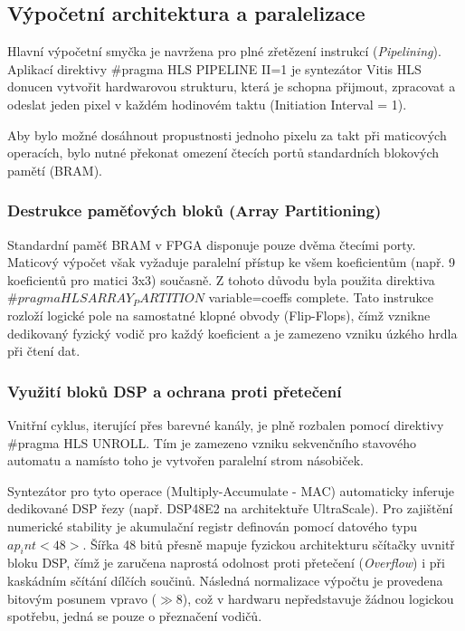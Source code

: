 \documentclass[FM,DP]{tulthesis}
\begin{document}
\subsection{Výpočetní architektura a paralelizace}

Hlavní výpočetní smyčka je navržena pro plné zřetězení instrukcí
(\textit{Pipelining}). Aplikací direktivy \#pragma HLS PIPELINE II=1 je
syntezátor Vitis HLS donucen vytvořit hardwarovou strukturu, která je schopna
přijmout, zpracovat a odeslat jeden pixel v každém hodinovém taktu (Initiation
Interval = 1).

Aby bylo možné dosáhnout propustnosti jednoho pixelu za takt při maticových
operacích, bylo nutné překonat omezení čtecích portů standardních blokových
pamětí (BRAM).

\subsubsection{Destrukce paměťových bloků (Array Partitioning)
}
Standardní paměť BRAM v FPGA disponuje pouze dvěma čtecími porty. Maticový
výpočet však vyžaduje paralelní přístup ke všem koeficientům (např. 9
koeficientů pro matici 3x3) současně. Z tohoto důvodu byla použita direktiva
$\#pragma HLS ARRAY_PARTITION$ variable=coeffs complete. Tato instrukce rozloží
logické pole na samostatné klopné obvody (Flip-Flops), čímž vznikne dedikovaný
fyzický vodič pro každý koeficient a je zamezeno vzniku úzkého hrdla při čtení
dat.

\subsubsection{Využití bloků DSP a ochrana proti přetečení
}
Vnitřní cyklus, iterující přes barevné kanály, je plně rozbalen pomocí
direktivy \#pragma HLS UNROLL. Tím je zamezeno vzniku sekvenčního stavového
automatu a namísto toho je vytvořen paralelní strom násobiček.

Syntezátor pro tyto operace (Multiply-Accumulate - MAC) automaticky inferuje
dedikované DSP řezy (např. DSP48E2 na architektuře UltraScale\+). Pro zajištění
numerické stability je akumulační registr definován pomocí datového typu
$ap_int<48>$. Šířka 48 bitů přesně mapuje fyzickou architekturu sčítačky uvnitř
bloku DSP, čímž je zaručena naprostá odolnost proti přetečení
(\textit{Overflow}) i při kaskádním sčítání dílčích součinů. Následná
normalizace výpočtu je provedena bitovým posunem vpravo ($\gg 8$), což v
hardwaru nepředstavuje žádnou logickou spotřebu, jedná se pouze o přeznačení
vodičů.
\end{document}
